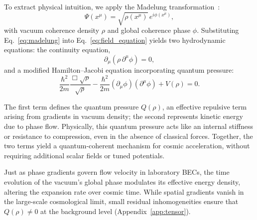 To extract physical intuition, we apply the Madelung transformation~\cite{Madelung1927}:
\begin{equation}
\Psi(x^\mu) = \sqrt{\rho(x^\mu)}\, e^{i\phi(x^\mu)},
\label{eq:madelung}
\end{equation}
with vacuum coherence density \( \rho \) and global coherence phase \( \phi \). Substituting Eq.~\eqref{eq:madelung} into Eq.~\eqref{eq:field_equation} yields two hydrodynamic equations: the continuity equation,
\begin{equation}
\partial_\mu (\rho\,\partial^\mu\phi) = 0,
\label{eq:continuity_1}
\end{equation}
and a modified Hamilton–Jacobi equation incorporating quantum pressure:
\begin{equation}
\frac{\hbar^2}{2m}\frac{\Box\sqrt{\rho}}{\sqrt{\rho}} - \frac{\hbar^2}{2m}(\partial_\mu\phi)(\partial^\mu\phi) + V(\rho) = 0.
\label{eq:hamilton_jacobi}
\end{equation}

The first term defines the quantum pressure \( Q(\rho) \), an effective repulsive term arising from gradients in vacuum density; the second represents kinetic energy due to phase flow. Physically, this quantum pressure acts like an internal stiffness or resistance to compression, even in the absence of classical forces. Together, the two terms yield a quantum-coherent mechanism for cosmic acceleration, without requiring additional scalar fields or tuned potentials.

Just as phase gradients govern flow velocity in laboratory BECs, the time evolution of the vacuum's global phase modulates its effective energy density, altering the expansion rate over cosmic time. While spatial gradients vanish in the large-scale cosmological limit, small residual inhomogeneities ensure that \( Q(\rho) \neq 0 \) at the background level (Appendix~\ref{app:tensor}).

